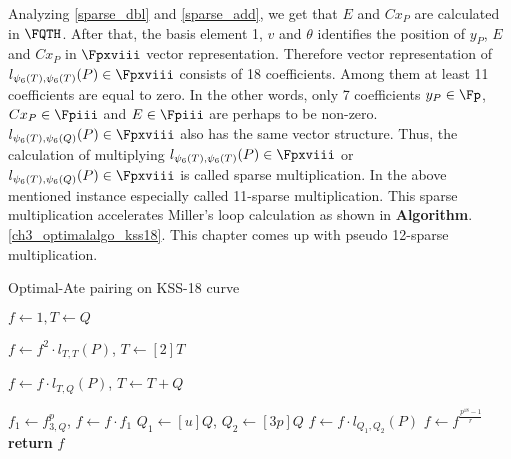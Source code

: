 Analyzing \eqref{sparse_dbl} and \eqref{sparse_add}, we get that  $E$ and $Cx_P$ are calculated in $\FQTH$. After that, the basis element 1, $v$ and $\theta$ identifies the position of $y_P$, $E$ and $Cx_P$ in $\Fpxviii$ vector representation. Therefore vector representation of $l_{\psi_6(T),\psi_6(T)}(P)\in \Fpxviii$ consists of 18 coefficients. Among them at least 11 coefficients are equal to zero. In the other words, only 7 coefficients $y_P\in \Fp$, $Cx_P\in \Fpiii$ and $E\in \Fpiii$ are perhaps to be non-zero.
$l_{\psi_6(T),\psi_6(Q)}(P)\in \Fpxviii$ also has the same vector structure. Thus, the calculation of multiplying $l_{\psi_6(T),\psi_6(T)}(P)\in \Fpxviii$ or $l_{\psi_6(T),\psi_6(Q)}(P)\in \Fpxviii$ is called sparse multiplication. In the above mentioned instance especially called 11-sparse multiplication. This sparse multiplication accelerates Miller's loop calculation as shown in  \textbf{Algorithm}.\ref{ch3_optimalalgo_kss18}. This chapter comes up with pseudo 12-sparse multiplication.
%
%
\begin{algorithm}[htbp]  
	\caption{Optimal-Ate pairing on KSS-18 curve}
	\label{ch3_optimalalgo_kss18}
	\DontPrintSemicolon

	 $f \leftarrow 1,T \leftarrow Q$\;
	  {
	 $f\leftarrow f^2\cdot l_{T,T}(P)$, $T\leftarrow [2]T$\;

	  {
	 $f\leftarrow f\cdot l_{T,Q}(P)$, $T\leftarrow T+Q$}}

	 $f_1\leftarrow f_{3,Q}^p$, $f\leftarrow f\cdot f_1$\;
	 $Q_1\leftarrow [u]Q$, $Q_2\leftarrow [3p]Q$\;
	 $f\leftarrow f\cdot l_{Q_1,Q_2}(P)$\;
	 $f\leftarrow f^{\frac{p^{18}-1}{r}}$\;
	 {\bf return} $f$\;
\end{algorithm}


